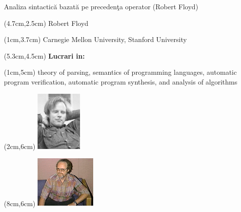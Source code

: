 \documentclass[pdf]{beamer}
\begin{document}
\begin{frame}{Analiza sintactică bazată pe precedenţa operator (Robert Floyd)} 
      \begin{textblock*}{14cm}(4.7cm,2.5cm)
		{\LARGE{Robert Floyd}}
      \end{textblock*}
       
      \begin{textblock*}{14cm}(1cm,3.7cm)
      {\small{Carnegie Mellon University, Stanford University}}
      \end{textblock*}
      
      \begin{textblock*}{14cm}(5.3cm,4.5cm)
       \textbf{{Lucrari in:}}\\ 
      \end{textblock*}
        
      \begin{textblock*}{11cm}(1cm,5cm)
        theory of parsing, semantics of programming languages, automatic program verification, automatic program synthesis, and analysis of algorithms
	  \end{textblock*}

\begin{textblock*}{11cm}(2cm,6cm)
\includegraphics[width=23mm,scale=0.1]{img/Picture1}
\end{textblock*}
\begin{textblock*}{11cm}(8cm,6cm)
\includegraphics[width=30mm,scale=0.6]{img/Picture2}
\end{textblock*}
\end{frame}
\end{document}
